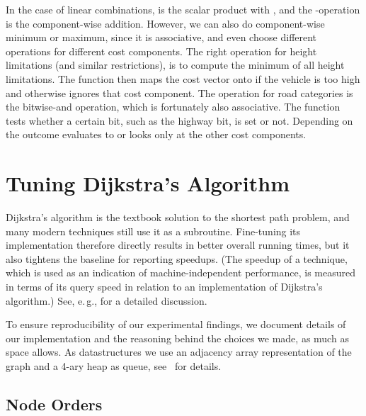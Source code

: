 \documentclass{sig-alternate}
\newcommand{\eg}{e.\,g.\xspace}
\begin{document}
In the case of linear combinations,  is the scalar product with , and the -operation is the component-wise addition. 
However, we can also do component-wise minimum or maximum, since it is associative, and even choose different operations for different cost components.
The right operation for height limitations (and similar restrictions), is to compute the minimum of all height limitations. 
The function  then maps the cost vector onto  if the vehicle is too high and otherwise ignores that cost component. 
The  operation for road categories is the bitwise-and operation, which is fortunately also associative.
The function  tests whether a certain bit, such as the highway bit, is set or not. 
Depending on the outcome  evaluates to  or  looks only at the other cost components. 

\section{Tuning Dijkstra's Algorithm}\label{sec:node-order}

Dijkstra's algorithm \cite{d-ntpcg-59} is the textbook solution to
the shortest path problem, and many modern techniques still use it as a subroutine. Fine-tuning its implementation therefore directly results in better overall running times, but it also tightens the baseline for reporting speedups. (The speedup of a technique, which is used as an indication of machine-independent performance, is measured in terms of its query speed in relation to an implementation of Dijkstra's algorithm.) 
See, \eg, \cite{bdgmpsww-rptn-14} for a detailed discussion.



To ensure reproducibility of our experimental findings, we document details of our implementation and the reasoning behind the choices we made, as much as space allows. As datastructures we use an adjacency array representation of the graph and a 4-ary heap as queue, see~\cite{bdgmpsww-rptn-14} for details.



\subsection{Node Orders}
\end{document}
